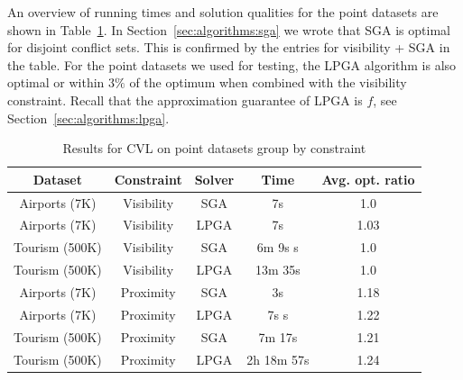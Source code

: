 An overview of running times and solution qualities for the point datasets are shown in Table~\ref{tab:points:overview}. In Section~\ref{sec:algorithms:sga} we wrote that SGA is optimal for disjoint conflict sets. This is confirmed by the entries for visibility + SGA in the table. For the point datasets we used for testing, the LPGA algorithm is also optimal or within $3\%$ of the optimum when combined with the visibility constraint. Recall that the approximation guarantee of LPGA is $f$, see Section~\ref{sec:algorithms:lpga}.

\begin{table}[htdp]
\caption{Results for CVL on point datasets group by constraint}
\begin{center}
\begin{tabular}{|c|c|c|c|c|}
\hline
\textbf{Dataset} & \textbf{Constraint} & \textbf{Solver} & \textbf{Time} & \textbf{Avg. opt. ratio}\\ 
\hline
Airports (7K) & Visibility & SGA & 7s & 1.0 \\
Airports (7K) & Visibility & LPGA & 7s & 1.03 \\
Tourism (500K) & Visibility & SGA & 6m 9s s & 1.0 \\
Tourism (500K) & Visibility & LPGA & 13m 35s & 1.0 \\
\hline
Airports (7K)  & Proximity  & SGA & 3s & 1.18 \\
Airports (7K)  & Proximity & LPGA & 7s s & 1.22 \\
Tourism (500K) & Proximity & SGA & 7m 17s & 1.21 \\
Tourism (500K) & Proximity & LPGA & 2h 18m 57s & 1.24 \\
\hline
\end{tabular}
\end{center}
\label{tab:points:overview}
\end{table}%

